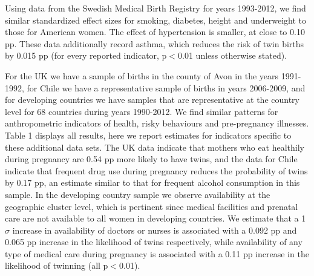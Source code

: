 \documentclass{nature}
\begin{document}
\begin{linenumbers}
Using data from the Swedish Medical Birth Registry for years 1993-2012, we find similar standardized effect sizes for smoking, diabetes, height and underweight to those for American women. The effect of hypertension is smaller, at close to 0.10 pp. These data additionally record asthma, which reduces the risk of twin births by 0.015 pp (for every reported indicator, p$<$0.01 unless otherwise stated). 

For the UK we have a sample of births in the county of Avon in the years 1991-1992, for Chile we have a representative sample of births in years 2006-2009, and for developing countries we have samples that are representative at the country level for 68 countries during years 1990-2012. We find similar patterns for anthropometric indicators of health, risky behaviours and pre-pregnancy illnesses. Table 1 displays all results, here we report estimates for indicators specific to these additional data sets. %
The UK data indicate that mothers who eat healthily during pregnancy are 0.54 pp more likely to have twins, 
and the data for Chile indicate that frequent drug use during pregnancy reduces the probability of twins by 0.17 pp, an estimate similar to that for frequent alcohol consumption in this sample. In the developing country sample we observe availability at the geographic cluster level, which is pertinent since medical facilities and prenatal care are not available to all women in developing countries. We estimate that a 1$\sigma$ increase in  availability of doctors or nurses is associated with a 0.092 pp and 0.065 pp increase in the likelihood of twins respectively, while availability of any type of medical care during pregnancy is associated with a 0.11 pp increase in the likelihood of twinning (all p$<$0.01). %


\end{linenumbers}
\end{document}
